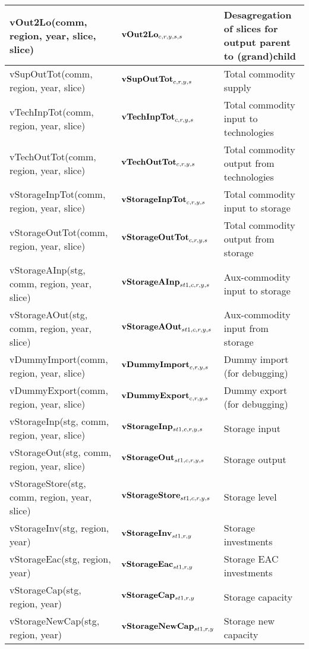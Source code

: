 \documentclass{article}
\begin{document}
\begin{longtable}{|p{10cm}|p{5cm}|p{9cm}|}
vOut2Lo(comm, region, year, slice, slice) & ${\bf vOut2Lo}_{c,r,y,s,s}$ & Desagregation of slices for output parent to (grand)child \\ 
 \hline
vSupOutTot(comm, region, year, slice) & ${\bf vSupOutTot}_{c,r,y,s}$ & Total commodity supply \\ 
 \hline
vTechInpTot(comm, region, year, slice) & ${\bf vTechInpTot}_{c,r,y,s}$ & Total commodity input to technologies \\ 
 \hline
vTechOutTot(comm, region, year, slice) & ${\bf vTechOutTot}_{c,r,y,s}$ & Total commodity output from technologies \\ 
 \hline
vStorageInpTot(comm, region, year, slice) & ${\bf vStorageInpTot}_{c,r,y,s}$ & Total commodity input to storage \\ 
 \hline
vStorageOutTot(comm, region, year, slice) & ${\bf vStorageOutTot}_{c,r,y,s}$ & Total commodity output from storage \\ 
 \hline
vStorageAInp(stg, comm, region, year, slice) & ${\bf vStorageAInp}_{st1,c,r,y,s}$ & Aux-commodity input to storage \\ 
 \hline
vStorageAOut(stg, comm, region, year, slice) & ${\bf vStorageAOut}_{st1,c,r,y,s}$ & Aux-commodity input from storage \\ 
 \hline
vDummyImport(comm, region, year, slice) & ${\bf vDummyImport}_{c,r,y,s}$ & Dummy import (for debugging) \\ 
 \hline
vDummyExport(comm, region, year, slice) & ${\bf vDummyExport}_{c,r,y,s}$ & Dummy export (for debugging) \\ 
 \hline
vStorageInp(stg, comm, region, year, slice) & ${\bf vStorageInp}_{st1,c,r,y,s}$ & Storage input \\ 
 \hline
vStorageOut(stg, comm, region, year, slice) & ${\bf vStorageOut}_{st1,c,r,y,s}$ & Storage output \\ 
 \hline
vStorageStore(stg, comm, region, year, slice) & ${\bf vStorageStore}_{st1,c,r,y,s}$ & Storage level \\ 
 \hline
vStorageInv(stg, region, year) & ${\bf vStorageInv}_{st1,r,y}$ & Storage investments \\ 
 \hline
vStorageEac(stg, region, year) & ${\bf vStorageEac}_{st1,r,y}$ & Storage EAC investments \\ 
 \hline
vStorageCap(stg, region, year) & ${\bf vStorageCap}_{st1,r,y}$ & Storage capacity \\ 
 \hline
vStorageNewCap(stg, region, year) & ${\bf vStorageNewCap}_{st1,r,y}$ & Storage new capacity \\ 

\end{longtable}
\end{document}
